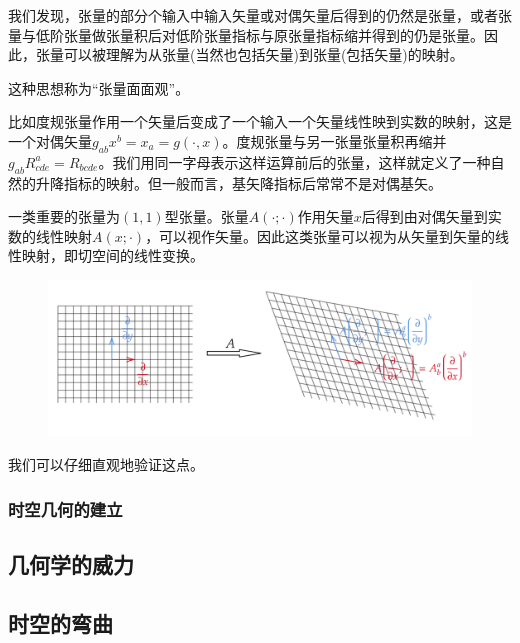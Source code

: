 \documentclass{article}
\begin{document}
我们发现，张量的部分个输入中输入矢量或对偶矢量后得到的仍然是张量，或者张量与低阶张量做张量积后对低阶张量指标与原张量指标缩并得到的仍是张量。因此，张量可以被理解为从张量(当然也包括矢量)到张量(包括矢量)的映射。

这种思想称为“张量面面观”。

比如度规张量作用一个矢量后变成了一个输入一个矢量线性映到实数的映射，这是一个对偶矢量$g_{ab}x^b=x_a=g(\cdot,x)$。度规张量与另一张量张量积再缩并$g_{ab}R^{a}_{cde}=R_{bcde}$。我们用同一字母表示这样运算前后的张量，这样就定义了一种自然的升降指标的映射。但一般而言，基矢降指标后常常不是对偶基矢。

一类重要的张量为$(1,1)$型张量。张量$A(\cdot ;\cdot)$作用矢量$x$后得到由对偶矢量到实数的线性映射$A(x;\cdot)$，可以视作矢量。因此这类张量可以视为从矢量到矢量的线性映射，即切空间的线性变换。

\begin{figure}[htbp]
    \centering
    \includegraphics[scale=0.25]{8.png}
\end{figure}

我们可以仔细直观地验证这点。

\subsubsection{时空几何的建立}
\subsection{几何学的威力}
\subsection{时空的弯曲}
\end{document}
